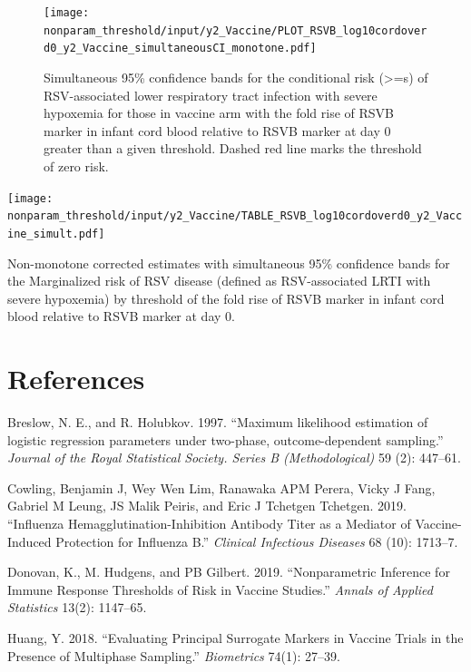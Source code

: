 \documentclass[11pt]{article}
\begin{document}
\begin{figure}[H]
    \centering
    \texttt{[image: nonparam\_threshold/input/y2\_Vaccine/PLOT\_RSVB\_log10cordoverd0\_y2\_Vaccine\_simultaneousCI\_monotone.pdf]}
   \caption{Simultaneous 95\% confidence bands for the conditional risk (>=s) of RSV-associated lower respiratory tract infection with severe hypoxemia for those in vaccine arm with the fold rise of RSVB marker in infant cord blood relative to RSVB marker at day 0 greater than a given threshold. Dashed red line marks the threshold of zero risk.}
      \label{tab:PLOT_RSVB_log10cordoverd0_y2_Vaccine_monotone}
\end{figure}

\begin{table}[H]
    \centering
    \texttt{[image: nonparam\_threshold/input/y2\_Vaccine/TABLE\_RSVB\_log10cordoverd0\_y2\_Vaccine\_simult.pdf]}
  \caption{Non-monotone corrected estimates with simultaneous 95\% confidence bands for the Marginalized risk of RSV disease (defined as RSV-associated LRTI with severe hypoxemia) by threshold of the fold rise of RSVB marker in infant cord blood relative to RSVB marker at day 0. }
\end{table}

\hypertarget{references}{%
\section{References}\label{references}}

\hypertarget{refs}{}
\leavevmode\hypertarget{ref-breslow1997maximum}{}%
Breslow, N. E., and R. Holubkov. 1997. ``Maximum likelihood estimation of logistic regression parameters under two-phase, outcome-dependent sampling.'' \emph{Journal of the Royal Statistical Society. Series B (Methodological)} 59 (2): 447--61.

\leavevmode\hypertarget{ref-cowling2019influenza}{}%
Cowling, Benjamin J, Wey Wen Lim, Ranawaka APM Perera, Vicky J Fang, Gabriel M Leung, JS Malik Peiris, and Eric J Tchetgen Tchetgen. 2019. ``Influenza Hemagglutination-Inhibition Antibody Titer as a Mediator of Vaccine-Induced Protection for Influenza B.'' \emph{Clinical Infectious Diseases} 68 (10): 1713--7.

\leavevmode\hypertarget{ref-donovan2019}{}%
Donovan, K., M. Hudgens, and PB Gilbert. 2019. ``Nonparametric Inference for Immune Response Thresholds of Risk in Vaccine Studies.'' \emph{Annals of Applied Statistics} 13(2): 1147--65.

\leavevmode\hypertarget{ref-huang2018evaluating}{}%
Huang, Y. 2018. ``Evaluating Principal Surrogate Markers in Vaccine Trials in the Presence of Multiphase Sampling.'' \emph{Biometrics} 74(1): 27--39.
\end{document}

